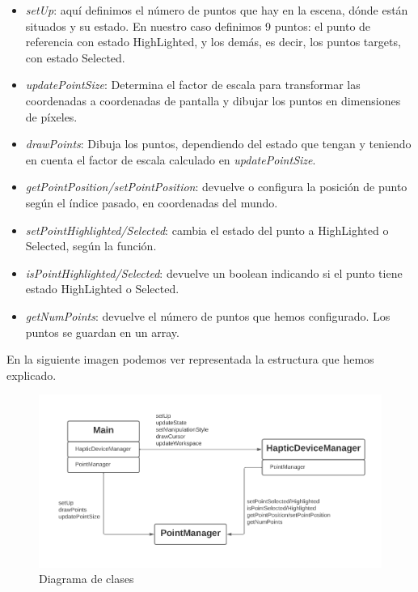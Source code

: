 \documentclass[a4paper,11pt, oneside]{book}
\begin{document}
\begin{itemize}
	\item \textit{setUp}: aquí definimos el número de puntos que hay en la escena, dónde están situados y su estado. En nuestro caso definimos 9 puntos: el punto de referencia con estado HighLighted, y los demás, es decir, los puntos targets, con estado Selected.
	
	\item \textit{updatePointSize}: Determina el factor de escala para transformar las coordenadas a coordenadas de pantalla y dibujar los puntos en dimensiones de píxeles.
	
	\item \textit{drawPoints}: Dibuja los puntos, dependiendo del estado que tengan y teniendo en cuenta el factor de escala calculado en \textit{updatePointSize}.
	
	\item \textit{getPointPosition/setPointPosition}: devuelve o configura la posición de punto según el índice pasado, en coordenadas del mundo.
	
	\item \textit{setPointHighlighted/Selected}: cambia el estado del punto a HighLighted o Selected, según la función.
	
	\item \textit{isPointHighlighted/Selected}: devuelve un boolean indicando si el punto tiene estado HighLighted o Selected.
	
	\item \textit{getNumPoints}: devuelve el número de puntos que hemos configurado. Los puntos se guardan en un array.
\end{itemize}

En la siguiente imagen podemos ver representada la estructura que hemos explicado.


\begin{figure}[H]
	
		\centering
		\includegraphics[width=0.9\linewidth]{diagrama}
		\caption{Diagrama de clases}
		\label{fig:figura1}

\end{figure}
\end{document}
